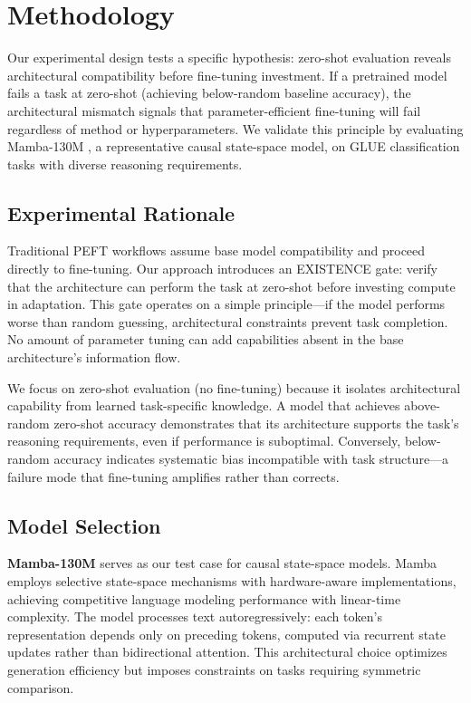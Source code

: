 \section{Methodology}

Our experimental design tests a specific hypothesis: zero-shot evaluation reveals architectural compatibility before fine-tuning investment. If a pretrained model fails a task at zero-shot (achieving below-random baseline accuracy), the architectural mismatch signals that parameter-efficient fine-tuning will fail regardless of method or hyperparameters. We validate this principle by evaluating Mamba-130M \cite{gu2023mamba}, a representative causal state-space model, on GLUE classification tasks \cite{wang2018glue} with diverse reasoning requirements.

\subsection{Experimental Rationale}

Traditional PEFT workflows assume base model compatibility and proceed directly to fine-tuning. Our approach introduces an EXISTENCE gate: verify that the architecture can perform the task at zero-shot before investing compute in adaptation. This gate operates on a simple principle---if the model performs worse than random guessing, architectural constraints prevent task completion. No amount of parameter tuning can add capabilities absent in the base architecture's information flow.

We focus on zero-shot evaluation (no fine-tuning) because it isolates architectural capability from learned task-specific knowledge. A model that achieves above-random zero-shot accuracy demonstrates that its architecture supports the task's reasoning requirements, even if performance is suboptimal. Conversely, below-random accuracy indicates systematic bias incompatible with task structure---a failure mode that fine-tuning amplifies rather than corrects.

\subsection{Model Selection}

\textbf{Mamba-130M} serves as our test case for causal state-space models. Mamba employs selective state-space mechanisms with hardware-aware implementations, achieving competitive language modeling performance with linear-time complexity. The model processes text autoregressively: each token's representation depends only on preceding tokens, computed via recurrent state updates rather than bidirectional attention. This architectural choice optimizes generation efficiency but imposes constraints on tasks requiring symmetric comparison.

